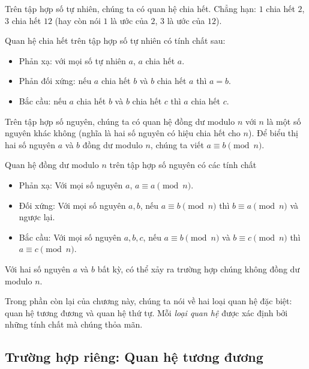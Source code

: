 \begin{example}
    Trên tập hợp số tự nhiên, chúng ta có quan hệ chia hết. Chẳng hạn: $1$ chia hết $2$, $3$ chia hết $12$ (hay còn nói $1$ là ước của $2$, $3$ là ước của $12$).

    Quan hệ chia hết trên tập hợp số tự nhiên có tính chất sau:
    \begin{itemize}
        \item Phản xạ: với mọi số tự nhiên $a$, $a$ chia hết $a$.
        \item Phản đối xứng: nếu $a$ chia hết $b$ và $b$ chia hết $a$ thì $a = b$.
        \item Bắc cầu: nếu $a$ chia hết $b$ và $b$ chia hết $c$ thì $a$ chia hết $c$.
    \end{itemize}
\end{example}

\begin{example}
    Trên tập hợp số nguyên, chúng ta có quan hệ đồng dư modulo $n$ với $n$ là một số nguyên khác không (nghĩa là hai số nguyên có hiệu chia hết cho $n$). Để biểu thị hai số nguyên $a$ và $b$ đồng dư modulo $n$, chúng ta viết $a\equiv b\pmod{n}$.

    \noindent Quan hệ đồng dư modulo $n$ trên tập hợp số nguyên có các tính chất
    \begin{itemize}
        \item Phản xạ: Với mọi số nguyên $a$, $a\equiv a\pmod{n}$.
        \item Đối xứng: Với mọi số nguyên $a, b$, nếu $a\equiv b\pmod{n}$ thì $b\equiv a\pmod{n}$ và ngược lại.
        \item Bắc cầu: Với mọi số nguyên $a, b, c$, nếu $a\equiv b\pmod{n}$ và $b\equiv c\pmod{n}$ thì $a\equiv c\pmod{n}$.
    \end{itemize}

    Với hai số nguyên $a$ và $b$ bất kỳ, có thể xảy ra trường hợp chúng không đồng dư modulo $n$.
\end{example}

Trong phần còn lại của chương này, chúng ta nói về hai loại quan hệ đặc biệt: quan hệ tương đương và quan hệ thứ tự. Mỗi \textit{loại quan hệ} được xác định bởi những tính chất mà chúng thỏa mãn.

\subsection{Trường hợp riêng: Quan hệ tương đương}

